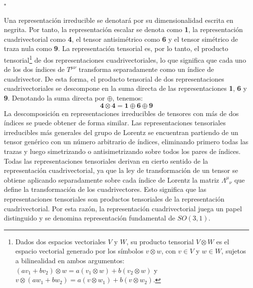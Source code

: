 \documentclass[a4paper,11pt]{book} %
\begin{document}
\begin{flushright}
    \(\square\)
\end{flushright}
\noindent
Una representación irreducible se denotará por su dimensionalidad escrita en negrita. Por tanto, la representación escalar se denota como \textbf{1}, la representación cuadrivectorial como \textbf{4}, el tensor antisimétrico como \textbf{6} y el tensor simétrico de traza nula como \textbf{9}. 
\medskip\newline
La representación tensorial es, por lo tanto, el producto tensorial\footnote{Dados dos espacios vectoriales $V$ y $W$, su producto tensorial $V\otimes W$ es el espacio vectorial generado por los símbolos $v\otimes w$, con $v\in V$ y $w\in W$, sujetos a bilinealidad en ambos argumentos: $(av_1+bv_2)\otimes w=a(v_1\otimes w)+b(v_2\otimes w)$ y $v\otimes(aw_1+bw_2)=a(v\otimes w_1)+b(v\otimes w_2)$.} de dos representaciones cuadrivectoriales, lo que significa que cada uno de los dos índices de $T^{\mu\nu}$ transforma separadamente como un índice de cuadrivector. De esta forma, el producto tensorial de dos representaciones cuadrivectoriales se descompone en la suma directa de las representaciones \textbf{1}, \textbf{6} y \textbf{9}. 
\medskip\newline
Denotando la suma directa por $\oplus$, tenemos:
\begin{equation}
\mathbf{4}\otimes\mathbf{4}=\mathbf{1}\oplus\mathbf{6}\oplus\mathbf{9}
\end{equation}
La descomposición en representaciones irreducibles de tensores con más de dos índices se puede obtener de forma similar. 
\medskip\newline
Las representaciones tensoriales irreducibles más generales del grupo de Lorentz se encuentran partiendo de un tensor genérico con un número arbitrario de índices, eliminando primero todas las trazas y luego simetrizando o antisimetrizando sobre todos los pares de índices. 
\medskip\newline
Todas las representaciones tensoriales derivan en cierto sentido de la representación cuadrivectorial, ya que la ley de transformación de un tensor se obtiene aplicando separadamente sobre cada índice de Lorentz la matriz ${\Lambda^{\mu}}_{\nu}$ que define la transformación de los cuadrivectores. Esto significa que las representaciones tensoriales son productos tensoriales de la representación cuadrivectorial. Por esta razón, la representación cuadrivectorial juega un papel distinguido y se denomina representación fundamental de $SO(3,1)$.
\end{document}
